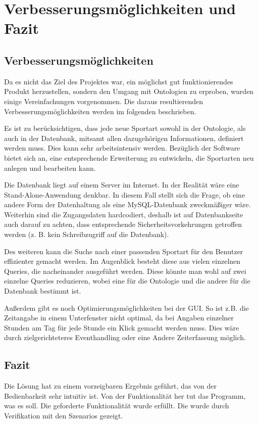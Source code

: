 \chapter{Verbesserungsmöglichkeiten und Fazit}

\section{Verbesserungsmöglichkeiten}

Da es nicht das Ziel des Projektes war, ein möglichst gut funktionierendes Produkt herzustellen, sondern den Umgang mit Ontologien zu erproben, wurden einige Vereinfachungen vorgenommen. Die daraus resultierenden Verbesserungsmöglichkeiten werden im folgenden beschrieben. 

Es ist zu berücksichtigen, dass jede neue Sportart sowohl in der Ontologie, als auch in der Datenbank, mitsamt allen dazugehörigen Informationen, definiert werden muss. Dies kann sehr arbeitsintensiv werden. Bezüglich der Software bietet sich an, eine entsprechende Erweiterung zu entwickeln, die Sportarten neu anlegen und bearbeiten kann. 

Die Datenbank liegt auf einem Server im Internet. In der Realität wäre eine Stand-Alone-Anwendung denkbar. In diesem Fall stellt sich die Frage, ob eine andere Form der Datenhaltung als eine MySQL-Datenbank zweckmäßiger wäre. Weiterhin sind die Zugangsdaten hardcodiert, deshalb ist auf Datenbankseite auch darauf zu achten, dass entsprechende Sicherheitsvorkehrungen getroffen werden (z. B. kein Schreibzugriff auf die Datenbank).

Des weiteren kann die Suche nach einer passenden Sportart für den Benutzer effizienter gemacht werden. Im Augenblick besteht diese aus vielen einzelnen Queries, die nacheinander ausgeführt werden. Diese könnte man wohl auf zwei einzelne Queries reduzieren, wobei eine für die Ontologie und die andere für die Datenbank bestimmt ist. 

Außerdem gibt es noch Optimierungsmöglichkeiten bei der GUI. 
So ist z.B. die Zeitangabe in einem Unterfenster nicht optimal, da bei Angaben einzelner Stunden am Tag für jede Stunde ein Klick gemacht werden muss. Dies wäre durch zielgerichteteres Eventhandling oder eine Andere Zeiterfassung möglich.

\section{Fazit}

Die Lösung hat zu einem vorzeigbaren Ergebnis geführt, das von der Bedienbarkeit sehr intuitiv ist. Von der Funktionalität her tut das Programm, was es soll. Die geforderte Funktionalität wurde erfüllt. Die wurde durch Verifikation mit den Szenarios gezeigt.
